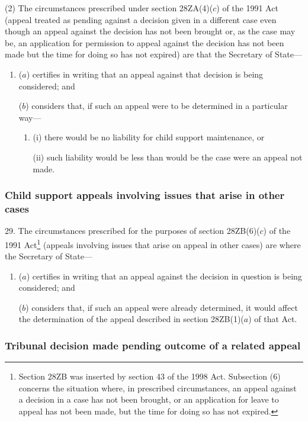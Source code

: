 \documentclass[12pt,a4paper]{article}
\begin{document}
(2) The circumstances prescribed under section 28ZA(4)($c$)  of the 1991 Act (appeal treated as pending against a decision given in a different case even though an appeal against the decision has not been brought or, as the case may be, an application for permission to appeal against the decision has not been made but the time for doing so has not expired) are that the Secretary of State—
\begin{enumerate}\item[]
($a$) certifies in writing that an appeal against that decision is being considered; and

($b$) considers that, if such an appeal were to be determined in a particular way—
\begin{enumerate}\item[]
(i) there would be no liability for child support maintenance, or

(ii) such liability would be less than would be the case were an appeal not made.
\end{enumerate}
\end{enumerate}

\subsubsection[29. Child support appeals involving issues that arise in other cases]{Child support appeals involving issues that arise in other cases}

29.  The circumstances prescribed for the purposes of section 28ZB(6)($c$)  of the 1991 Act\footnote{Section 28ZB was inserted by section 43 of the 1998 Act. Subsection (6) concerns the situation where, in prescribed circumstances, an appeal against a decision in a case has not been brought, or an application for leave to appeal has not been made, but the time for doing so has not expired.} (appeals involving issues that arise on appeal in other cases) are where the Secretary of State—
\begin{enumerate}\item[]
($a$) certifies in writing that an appeal against the decision in question is being considered; and

($b$) considers that, if such an appeal were already determined, it would affect the determination of the appeal described in section 28ZB(1)($a$)  of that Act.
\end{enumerate}

\subsubsection[30. Tribunal decision made pending outcome of a related appeal]{Tribunal decision made pending outcome of a related appeal}
\end{document}
